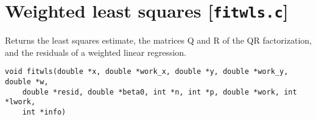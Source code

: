 \documentclass[a4paper,oneside,10pt,DIV=12]{scrartcl}
\begin{document}
\section{Weighted least squares [\texttt{fitwls.c}]}
\begin{Description}
	Returns the least squares estimate, the matrices Q and R of the QR
	factorization, and the residuals of a weighted linear regression.
\end{Description}
\begin{Usage}
\begin{verbatim}
void fitwls(double *x, double *work_x, double *y, double *work_y, double *w,
    double *resid, double *beta0, int *n, int *p, double *work, int *lwork,
    int *info)
\end{verbatim}
\end{Usage}
\end{document}
